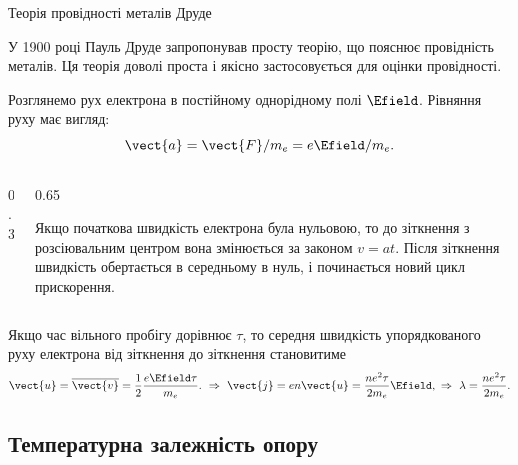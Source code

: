 \documentclass[onlytextwidth]{beamer}
\begin{document}
\begin{frame}{Теорія провідності металів Друде}{}
	\begin{block}{}\justifying\small
		У 1900 році Пауль Друде запропонував просту теорію, що пояснює провідність металів. Ця теорія
		доволі проста і якісно застосовується для оцінки провідності.
	\end{block}
	\begin{block}{}\justifying
		Розглянемо рух електрона в постійному однорідному полі $\Efield$. Рівняння руху має вигляд:
		\begin{equation*}
			\vect{a} = \vect{F} / m_e = e\Efield / m_e.
		\end{equation*}
	\end{block}

	\begin{columns}
		\begin{column}{0.3\linewidth}\centering
			
		\end{column}
		\begin{column}{0.65\linewidth}
			\begin{block}{}\justifying\small
				Якщо початкова швидкість електрона була нульовою, то до зіткнення з розсіювальним центром
				вона змінюється за законом ${v} = {a} t$. Після зіткнення швидкість обертається в
				середньому в нуль, і починається новий цикл прискорення.
			\end{block}
		\end{column}
	\end{columns}
	\begin{block}{}\justifying
		Якщо час вільного пробігу дорівнює $\tau$, то середня швидкість упорядкованого руху
		електрона
		від зіткнення до зіткнення становитиме
		\begin{equation*}
			\vect{u} = \overline{\vect{v}} = \frac12 \frac{e\Efield \tau}{m_e}.\
			\Rightarrow\ \vect{j} = en\vect{u} = \frac{ne^2\tau}{2m_e}\Efield, \
			\Rightarrow\ \lambda = \frac{ne^2\tau}{2m_e}.
		\end{equation*}
	\end{block}
\end{frame}


\subsection{Температурна залежність опору}
\end{document}
